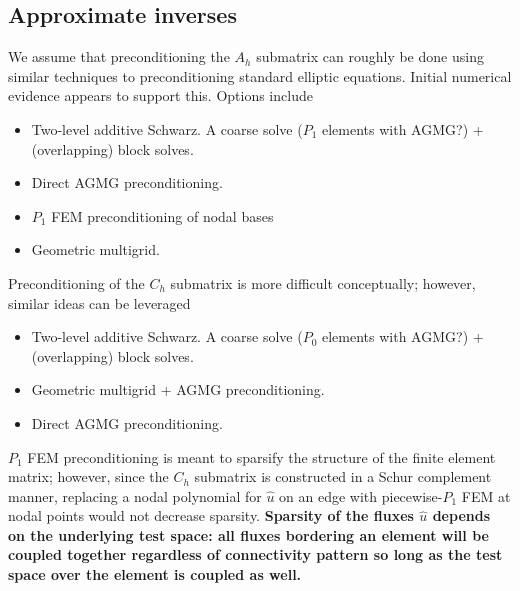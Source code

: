 \documentclass{article}
\newcommand{\uh}{\widehat{u}}
\begin{document}
%
%
\subsection{Approximate inverses}

We assume that preconditioning the $A_h$ submatrix can roughly be done using similar techniques to preconditioning standard elliptic equations.  Initial numerical evidence appears to support this.  Options include 
\begin{itemize}
\item Two-level additive Schwarz.  A coarse solve ($P_1$ elements with AGMG?) + (overlapping) block solves. 
\item Direct AGMG preconditioning.  
\item $P_1$ FEM preconditioning of nodal bases 
\item Geometric multigrid.  
\end{itemize}

Preconditioning of the $C_h$ submatrix is more difficult conceptually; however, similar ideas can be leveraged
\begin{itemize}
\item Two-level additive Schwarz.  A coarse solve ($P_0$ elements with AGMG?) + (overlapping) block solves. 
\item Geometric multigrid + AGMG preconditioning.  
\item Direct AGMG preconditioning.  
\end{itemize}
$P_1$ FEM preconditioning is meant to sparsify the structure of the finite element matrix; however, since the $C_h$ submatrix is constructed in a Schur complement manner, replacing a nodal polynomial for $\uh$ on an edge with piecewise-$P_1$ FEM at nodal points would not decrease sparsity.  \textbf{Sparsity of the fluxes $\uh$ depends on the underlying test space: all fluxes bordering an element will be coupled together regardless of connectivity pattern so long as the test space over the element is coupled as well.}  
\end{document}
